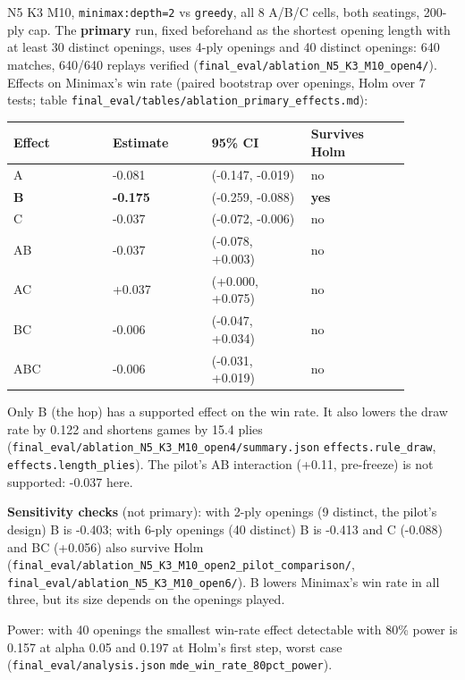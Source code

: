 \documentclass[11pt]{article}
\begin{document}
N5 K3 M10, \texttt{minimax:depth=2} vs \texttt{greedy}, all 8 A/B/C cells, both seatings, 200-ply cap. The
\textbf{primary} run, fixed beforehand as the shortest opening length with at least 30 distinct
openings, uses 4-ply openings and 40 distinct openings: 640 matches, 640/640 replays verified
(\texttt{final\_eval/ablation\_N5\_K3\_M10\_open4/}). Effects on Minimax's win rate (paired bootstrap over
openings, Holm over 7 tests; table \texttt{final\_eval/tables/ablation\_primary\_effects.md}):

\begin{center}\scriptsize
\begin{longtable}{p{0.22\linewidth}p{0.22\linewidth}p{0.22\linewidth}p{0.22\linewidth}}
\toprule
Effect & Estimate & 95\% CI & Survives Holm \\
\midrule
A & -0.081 & (-0.147, -0.019) & no \\
\textbf{B} & \textbf{-0.175} & (-0.259, -0.088) & \textbf{yes} \\
C & -0.037 & (-0.072, -0.006) & no \\
AB & -0.037 & (-0.078, +0.003) & no \\
AC & +0.037 & (+0.000, +0.075) & no \\
BC & -0.006 & (-0.047, +0.034) & no \\
ABC & -0.006 & (-0.031, +0.019) & no \\
\bottomrule
\end{longtable}
\end{center}

Only B (the hop) has a supported effect on the win rate. It also lowers the draw rate by 0.122
and shortens games by 15.4 plies (\texttt{final\_eval/ablation\_N5\_K3\_M10\_open4/summary.json}
\texttt{effects.rule\_draw}, \texttt{effects.length\_plies}). The pilot's AB interaction (+0.11, pre-freeze) is
not supported: -0.037 here.

\textbf{Sensitivity checks} (not primary): with 2-ply openings (9 distinct, the pilot's design) B is
-0.403; with 6-ply openings (40 distinct) B is -0.413 and C (-0.088) and BC (+0.056) also survive
Holm (\texttt{final\_eval/ablation\_N5\_K3\_M10\_open2\_pilot\_comparison/}, \texttt{final\_eval/ablation\_N5\_K3\_M10\_open6/}).
B lowers Minimax's win rate in all three, but its size depends on the openings played.

Power: with 40 openings the smallest win-rate effect detectable with 80\% power is 0.157 at
alpha 0.05 and 0.197 at Holm's first step, worst case (\texttt{final\_eval/analysis.json}
\texttt{mde\_win\_rate\_80pct\_power}).
\end{document}
